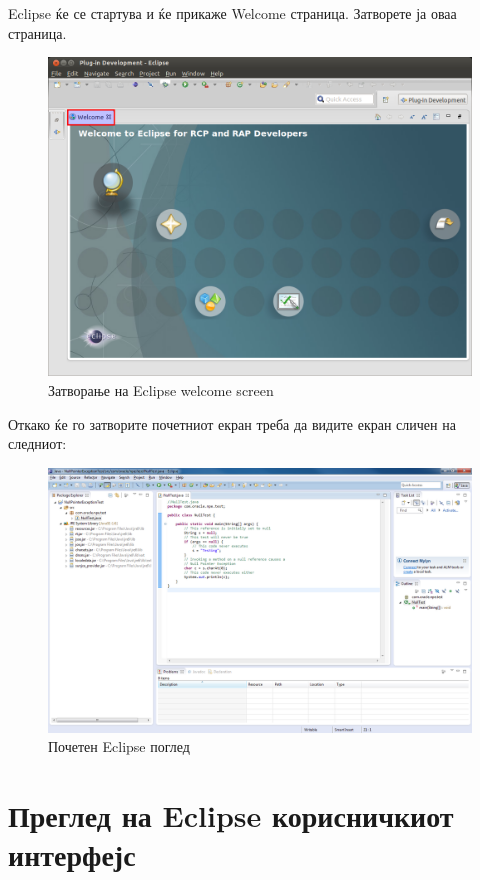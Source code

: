 Eclipse ќе се стартува и ќе прикаже Welcome страница. Затворете ја оваа
страница.

\begin{figure}
\centering
\includegraphics[width=\textwidth]{images/welcome}
\caption{Затворање на Eclipse welcome screen}
\end{figure}

Откако ќе го затворите почетниот екран треба да видите екран сличен на следниот:

\begin{figure}
\centering
\includegraphics[width=\textwidth]{images/screen}
\caption{Почетен Eclipse поглед}
\end{figure}


\section{Преглед на Eclipse корисничкиот интерфејс}

